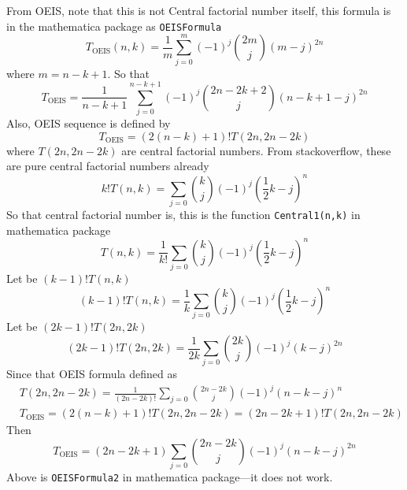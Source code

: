 From OEIS, note that this is not Central factorial number itself, this formula is in the mathematica package as
\texttt{OEISFormula}
\begin{equation*}
    T_{\mathrm{OEIS}} (n,k) = \frac{1}{m} \sum_{j=0}^{m} (-1)^{j} \binom{2m}{j} (m-j)^{2n}
\end{equation*}
where $m=n-k+1$.
So that
\begin{equation*}
    T_{\mathrm{OEIS}} = \frac{1}{n-k+1} \sum_{j=0}^{n-k+1} (-1)^{j} \binom{2n-2k+2}{j} (n-k+1-j)^{2n}
\end{equation*}
Also, OEIS sequence is defined by
\begin{equation*}
    T_{\mathrm{OEIS}} = (2(n-k) + 1)! T(2n, 2n-2k)
\end{equation*}
where $T(2n, 2n-2k)$ are central factorial numbers.
From stackoverflow, these are pure central factorial numbers already
\begin{equation*}
    k! T(n,k) = \sum_{j=0} \binom{k}{j} (-1)^{j} \left( \frac{1}{2}k - j \right)^{n}
\end{equation*}
So that central factorial number is, this is the function \texttt{Central1(n,k)} in mathematica package
\begin{equation*}
    T(n,k) = \frac{1}{k!} \sum_{j=0} \binom{k}{j} (-1)^{j} \left( \frac{1}{2}k - j \right)^{n}
\end{equation*}
Let be $(k-1)! T(n,k)$
\begin{equation*}
(k-1)
    !T(n,k) = \frac{1}{k} \sum_{j=0} \binom{k}{j} (-1)^{j} \left( \frac{1}{2}k - j \right)^{n}
\end{equation*}
Let be $(2k-1)! T(2n, 2k)$
\begin{equation*}
(2k-1)
    !T(2n, 2k) = \frac{1}{2k} \sum_{j=0} \binom{2k}{j} (-1)^{j} (k-j)^{2n}
\end{equation*}
Since that OEIS formula defined as
\begin{equation*}
    \begin{split}
        &T(2n, 2n-2k) = \frac{1}{(2n-2k)!} \sum_{j=0} \binom{2n-2k}{j} (-1)^{j} \left( n - k - j \right)^{n} \\
        &T_{\mathrm{OEIS}} = (2(n-k) + 1)! T(2n, 2n-2k) = (2n-2k+1)! T(2n, 2n-2k)
    \end{split}
\end{equation*}
Then
\begin{equation*}
    T_{\mathrm{OEIS}} = (2n-2k+1) \sum_{j=0} \binom{2n-2k}{j} (-1)^{j} (n-k-j)^{2n}
\end{equation*}
Above is \texttt{OEISFormula2} in mathematica package—it does not work.